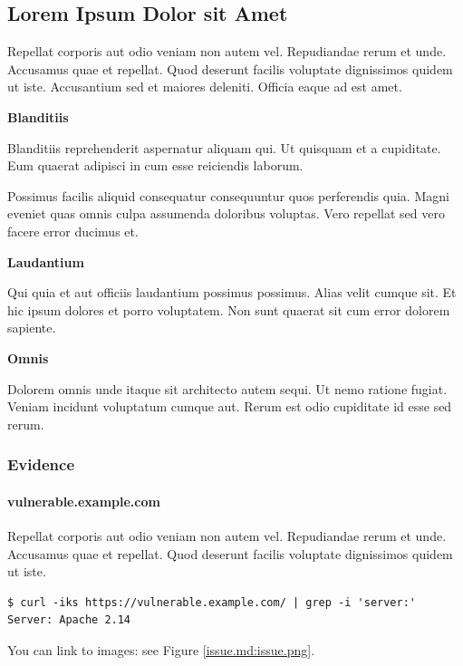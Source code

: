 \documentclass[a4paper]{article}
\begin{document}
      \newpage
    
    \subsection{Lorem Ipsum Dolor sit Amet}
    \label{issue.md}

    Repellat corporis aut odio veniam non autem vel.
Repudiandae rerum et unde. Accusamus quae et repellat.
Quod deserunt facilis voluptate dignissimos quidem ut iste.
Accusantium sed et maiores deleniti.
Officia eaque ad est amet.

\textbf{Blanditiis}

Blanditiis reprehenderit aspernatur aliquam qui.
Ut quisquam et a cupiditate.
Eum quaerat adipisci in cum esse reiciendis laborum.

Possimus facilis aliquid consequatur consequuntur quos perferendis quia.
Magni eveniet quas omnis culpa assumenda doloribus voluptas.
Vero repellat sed vero facere error ducimus et.

\textbf{Laudantium}

Qui quia et aut officiis laudantium possimus possimus.
Alias velit cumque sit.
Et hic ipsum dolores et porro voluptatem.
Non sunt quaerat sit cum error dolorem sapiente.

\textbf{Omnis}

Dolorem omnis unde itaque sit architecto autem sequi.
Ut nemo ratione fugiat.
Veniam incidunt voluptatum cumque aut.
Rerum est odio cupiditate id esse sed rerum.


    \subsubsection{Evidence}

          \paragraph{vulnerable.example.com}

      Repellat corporis aut odio veniam non autem vel.
Repudiandae rerum et unde. Accusamus quae et repellat.
Quod deserunt facilis voluptate dignissimos quidem ut iste.

\begin{lstlisting}
$ curl -iks https://vulnerable.example.com/ | grep -i 'server:'
Server: Apache 2.14
\end{lstlisting}

You can link to images: see Figure \ref{issue.md:issue.png}.
\end{document}
